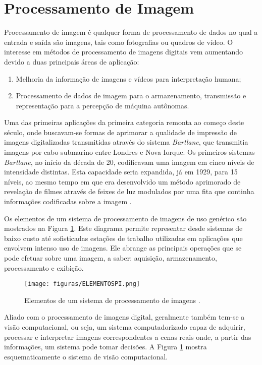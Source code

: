 \section{Processamento de Imagem}
Processamento de imagem é qualquer forma de processamento de dados no qual a entrada e saída são imagens, tais como fotografias ou quadros de vídeo. O interesse em métodos de processamento de imagens digitais vem aumentando devido a duas principais áreas de aplicação:

\begin{enumerate}
\item Melhoria da informação de imagens e vídeos para interpretação humana;
\item Processamento de dados de imagem para o armazenamento, transmissão e representação para a percepção de máquina autônomas.
\end{enumerate}

Uma das primeiras aplicações da primeira categoria remonta ao começo deste século, onde buscavam-se formas de aprimorar a qualidade de impressão de imagens digitalizadas transmitidas através do sistema \textit{Bartlane}, que transmitia imagens por cabo submarino entre Londres e Nova Iorque. Os primeiros sistemas \textit{Bartlane}, no início da década de 20, codificavam uma imagem em cinco níveis de intensidade distintas. Esta capacidade seria expandida, já em 1929, para 15 níveis, ao mesmo tempo em que era desenvolvido um método aprimorado de revelação de filmes através de feixes de luz modulados por uma fita que continha informações codificadas sobre a imagem \cite{MARQUESFILHO}.

Os elementos de um sistema de processamento de imagens de uso genérico são mostrados na Figura \ref{ELEMENTOSPI}. Este diagrama \cite{MARQUESFILHO} permite representar desde sistemas de baixo custo até sofisticadas estações de trabalho utilizadas em aplicações que envolvem intenso uso de imagens. Ele abrange as principais operações que se pode efetuar sobre uma imagem, a saber: aquisição, armazenamento, processamento e exibição.

\begin{figure}
	\centering
	\texttt{[image: figuras/ELEMENTOSPI.png]}
    \caption{Elementos de um sistema de processamento de imagens \cite{InstrumentacaodeAeronaves}.}
    \label{ELEMENTOSPI}
\end{figure}

Aliado com o processamento de imagens digital, geralmente também tem-se a visão computacional, ou seja, um sistema computadorizado capaz de adquirir, processar e interpretar imagens correspondentes a cenas reais onde, a partir das informações, um sistema pode tomar decisões. A Figura \ref{ELEMENTOSPI} mostra esquematicamente o sistema de visão computacional. 


